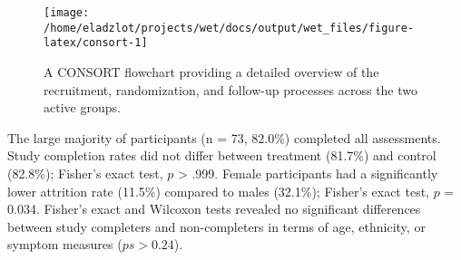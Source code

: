 \documentclass[
  man,floatsintext]{apa7}
\begin{document}
\begin{figure}
\texttt{[image: /home/eladzlot/projects/wet/docs/output/wet\_files/figure-latex/consort-1]} \caption{A CONSORT flowchart providing a detailed overview of the recruitment, randomization, and follow-up processes across the two active groups.}\label{fig:consort}
\end{figure}

The large majority of participants (n = 73, 82.0\%) completed all assessments.
Study completion rates did not differ between treatment (81.7\%) and control (82.8\%); Fisher's exact test, \(p\) \textgreater{} .999.
Female participants had a significantly lower attrition rate (11.5\%) compared to males (32.1\%); Fisher's exact test, \(p\) = 0.034.
Fisher's exact and Wilcoxon tests revealed no significant differences between study completers and non-completers in terms of age, ethnicity, or symptom measures (\(ps > 0.24\)).
\end{document}
